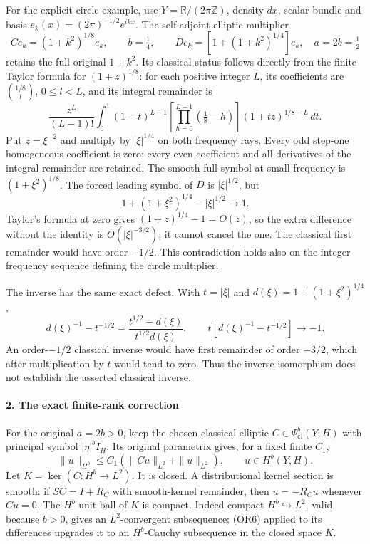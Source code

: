 \documentclass[
  11pt,
]{article}
\begin{document}
For the explicit circle example, use \(Y=\mathbb R/(2\pi\mathbb Z)\),
density \(dx\), scalar bundle and basis \(e_k(x)=(2\pi)^{-1/2}e^{ikx}\).
The self-adjoint elliptic multiplier \[
 Ce_k=(1+k^2)^{1/8}e_k,\qquad b=\tfrac14,
 \qquad De_k=[1+(1+k^2)^{1/4}]e_k,
 \quad a=2b=\tfrac12
 \tag{OR2}
\] retains the full original \(1+k^2\). Its classical status follows
directly from the finite Taylor formula for \((1+z)^{1/8}\): for each
positive integer \(L\), its coefficients are \(\binom{1/8}{l}\),
\(0\leq l<L\), and its integral remainder is \[
 \frac{z^L}{(L-1)!}\int_0^1(1-t)^{L-1}
 \left[\prod_{h=0}^{L-1}(\tfrac18-h)\right]
 (1+tz)^{1/8-L}\,dt .
 \tag{OR3}
\] Put \(z=\xi^{-2}\) and multiply by \(|\xi|^{1/4}\) on both frequency
rays. Every odd step-one homogeneous coefficient is zero; every even
coefficient and all derivatives of the integral remainder are retained.
The smooth full symbol at small frequency is \((1+\xi^2)^{1/8}\). The
forced leading symbol of \(D\) is \(|\xi|^{1/2}\), but \[
 1+(1+\xi^2)^{1/4}-|\xi|^{1/2}\longrightarrow1.
 \tag{OR4}
\] Taylor's formula at zero gives \((1+z)^{1/4}-1=O(z)\), so the extra
difference without the identity is \(O(|\xi|^{-3/2})\); it cannot cancel
the one. The classical first remainder would have order \(-1/2\). This
contradiction holds also on the integer frequency sequence defining the
circle multiplier.

The inverse has the same exact defect. With \(t=|\xi|\) and
\(d(\xi)=1+(1+\xi^2)^{1/4}\), \[
 d(\xi)^{-1}-t^{-1/2}
 =\frac{t^{1/2}-d(\xi)}{t^{1/2}d(\xi)},
 \qquad t[d(\xi)^{-1}-t^{-1/2}]\longrightarrow-1.
 \tag{OR5}
\] An order-\(-1/2\) classical inverse would have first remainder of
order \(-3/2\), which after multiplication by \(t\) would tend to zero.
Thus the inverse isomorphism does not establish the asserted classical
inverse.

\paragraph{2. The exact finite-rank
correction}\label{the-exact-finite-rank-correction}

For the original \(a=2b>0\), keep the chosen classical elliptic
\(C\in\Psi^b_{\mathrm{cl}}(Y;H)\) with principal symbol
\(|\eta|^b I_H\). Its original parametrix gives, for a fixed finite
\(C_1\), \[
 \|u\|_{H^b}\leq C_1(\|Cu\|_{L^2}+\|u\|_{L^2}),
 \qquad u\in H^b(Y,H).
 \tag{OR6}
\] Let \(K=\ker(C:H^b\to L^2)\). It is closed. A distributional kernel
section is smooth: if \(SC=I+R_C\) with smooth-kernel remainder, then
\(u=-R_Cu\) whenever \(Cu=0\). The \(H^b\) unit ball of \(K\) is
compact. Indeed compact \(H^b\hookrightarrow L^2\), valid because
\(b>0\), gives an \(L^2\)-convergent subsequence; (OR6) applied to its
differences upgrades it to an \(H^b\)-Cauchy subsequence in the closed
space \(K\).
\end{document}
